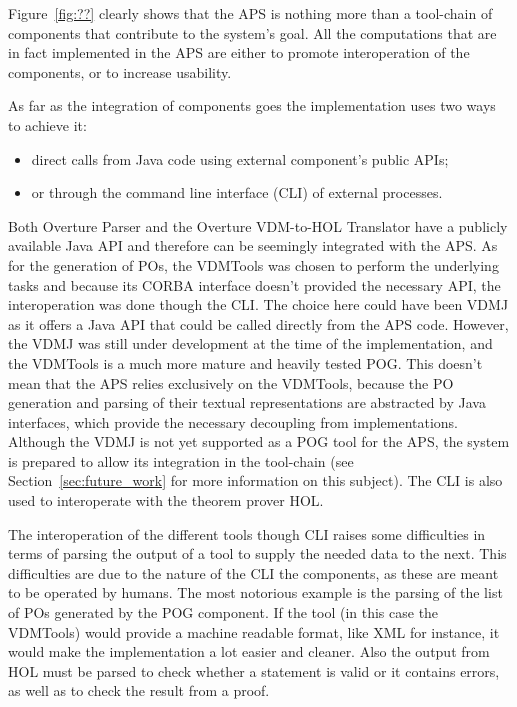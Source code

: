 \documentclass[]{article}
\begin{document}
Figure~\ref{fig:??} clearly shows that the APS is nothing more than a tool-chain of components that contribute to the system's goal.
All the computations that are in fact implemented in the APS are either to promote interoperation of the components, or to increase usability.

As far as the integration of components goes the implementation uses two ways to achieve it:
\begin{itemize}
  \item direct calls from Java code using external component's public APIs;
  \item or through the command line interface (CLI) of external processes.
\end{itemize}

Both Overture Parser and the Overture VDM-to-HOL Translator have a publicly available Java API and therefore can be seemingly integrated with the APS.
As for the generation of POs, the VDMTools was chosen to perform the underlying tasks and because its CORBA interface doesn't provided the necessary API, the interoperation was done though the CLI.
The choice here could have been VDMJ as it offers a Java API that could be called directly from the APS code.
However, the VDMJ was still under development at the time of the implementation, and the VDMTools is a much more mature and heavily tested POG.
This doesn't mean that the APS relies exclusively on the VDMTools, because the PO generation and parsing of their textual representations are abstracted by Java interfaces, which provide the necessary decoupling from implementations.
Although the VDMJ is not yet supported as a POG tool for the APS, the system is prepared to allow its integration in the tool-chain (see Section~\ref{sec:future_work} for more information on this subject).
The CLI is also used to interoperate with the theorem prover HOL.

The interoperation of the different tools though CLI raises some difficulties in terms of parsing the output of a tool to supply the needed data to the next.
This difficulties are due to the nature of the CLI the components, as these are meant to be operated by humans.
The most notorious example is the parsing of the list of POs generated by the POG component.
If the tool (in this case the VDMTools) would provide a machine readable format, like XML for instance, it would make the implementation a lot easier and cleaner.
Also the output from HOL must be parsed to check whether a statement is valid or it contains errors, as well as to check the result from a  proof.
\end{document}
